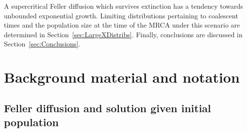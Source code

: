 \documentclass[preprint,12pt]{elsarticle}
\begin{document}
A supercritical Feller diffusion which survives extinction has a tendency towards unbounded exponential growth.  Limiting distributions pertaining to coalescent 
times and the population size at the time of the MRCA under this scenario are determined in Section~\ref{sec:LargeXDistribs}.  Finally, 
conclusions are discussed in Section~\ref{sec:Conclusions}.  

%

\section{Background material and notation}
\label{sec:Background}

%

\subsection{Feller diffusion and solution given initial population}
\label{sec:FellerDiff}
\end{document}
